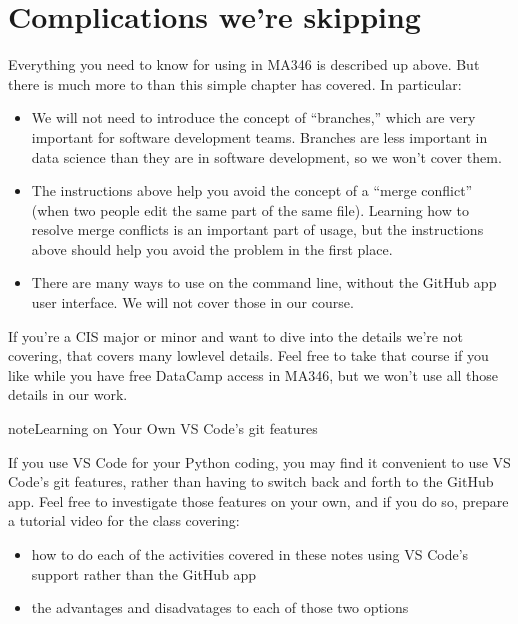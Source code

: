 \documentclass[letterpaper,10pt,english]{sphinxmanual}
\begin{document}
\section{Complications we’re skipping}
\label{\detokenize{chapter-8-version-control:complications-we-re-skipping}}
Everything you need to know for using  in MA346 is described up above.  But there is much more to  than this simple chapter has covered.  In particular:
\begin{itemize}
\item {} 
We will not need to introduce the concept of “branches,” which are very important for software development teams.  Branches are less important in data science than they are in software development, so we won’t cover them.

\item {} 
The instructions above help you avoid the concept of a “merge conflict” (when two people edit the same part of the same file).  Learning how to resolve merge conflicts is an important part of  usage, but the instructions above should help you avoid the problem in the first place.

\item {} 
There are many ways to use  on the command line, without the GitHub app user interface.  We will not cover those in our course.

\end{itemize}

If you’re a CIS major or minor and want to dive into the details we’re not covering,  that covers many low\sphinxhyphen{}level details.  Feel free to take that course if you like while you have free DataCamp access in MA346, but we won’t use all those details in our work.

\begin{sphinxadmonition}{note}{Learning on Your Own \sphinxhyphen{} VS Code’s git features}

If you use VS Code for your Python coding, you may find it convenient to use VS Code’s git features, rather than having to switch back and forth to the GitHub app.  Feel free to investigate those features on your own, and if you do so, prepare a tutorial video for the class covering:
\begin{itemize}
\item {} 
how to do each of the activities covered in these notes using VS Code’s  support rather than the GitHub app

\item {} 
the advantages and disadvatages to each of those two options

\end{itemize}
\end{sphinxadmonition}
\end{document}
